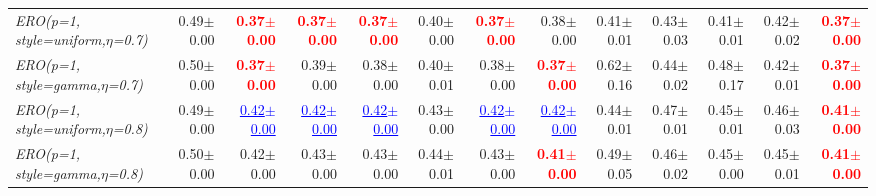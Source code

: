 \documentclass[nohyperref]{article}
\theoremstyle{plain}
\theoremstyle{definition}
\theoremstyle{remark}
\newcommand{\red}[1]{\textcolor{red}{\textbf{#1}}}
\newcommand{\blue}[1]{\textcolor{blue}{\underline{#1}}}
\begin{document}
\begin{table*}[!ht]
{\begin{tabular}{lrr|rrrrr|rrrrr}
			{\it ERO(p=1, style=uniform,$\eta$=0.7)} & 0.49$\pm$0.00 & \red{0.37$\pm$0.00} & \red{0.37$\pm$0.00} & \red{0.37$\pm$0.00} & 0.40$\pm$0.00 & \red{0.37$\pm$0.00} & 0.38$\pm$0.00 & 0.41$\pm$0.01 & 0.43$\pm$0.03 & 0.41$\pm$0.01 & 0.42$\pm$0.02 & \red{0.37$\pm$0.00} \\
			{\it ERO(p=1, style=gamma,$\eta$=0.7)} & 0.50$\pm$0.00 & \red{0.37$\pm$0.00} & 0.39$\pm$0.00 & 0.38$\pm$0.00 & 0.40$\pm$0.01 & 0.38$\pm$0.00 & \red{0.37$\pm$0.00} & 0.62$\pm$0.16 & 0.44$\pm$0.02 & 0.48$\pm$0.17 & 0.42$\pm$0.01 & \red{0.37$\pm$0.00} \\
			{\it ERO(p=1, style=uniform,$\eta$=0.8)} & 0.49$\pm$0.00 & \blue{0.42$\pm$0.00} & \blue{0.42$\pm$0.00} & \blue{0.42$\pm$0.00} & 0.43$\pm$0.00 & \blue{0.42$\pm$0.00} & \blue{0.42$\pm$0.00} & 0.44$\pm$0.01 & 0.47$\pm$0.01 & 0.45$\pm$0.01 & 0.46$\pm$0.03 & \red{0.41$\pm$0.00} \\
			{\it ERO(p=1, style=gamma,$\eta$=0.8)} & 0.50$\pm$0.00 & 0.42$\pm$0.00 & 0.43$\pm$0.00 & 0.43$\pm$0.00 & 0.44$\pm$0.01 & 0.43$\pm$0.00 & \red{0.41$\pm$0.00} & 0.49$\pm$0.05 & 0.46$\pm$0.02 & 0.45$\pm$0.00 & 0.45$\pm$0.01 & \red{0.41$\pm$0.00} \\
\bottomrule
\end{tabular}}
\end{table*}
\end{document}

